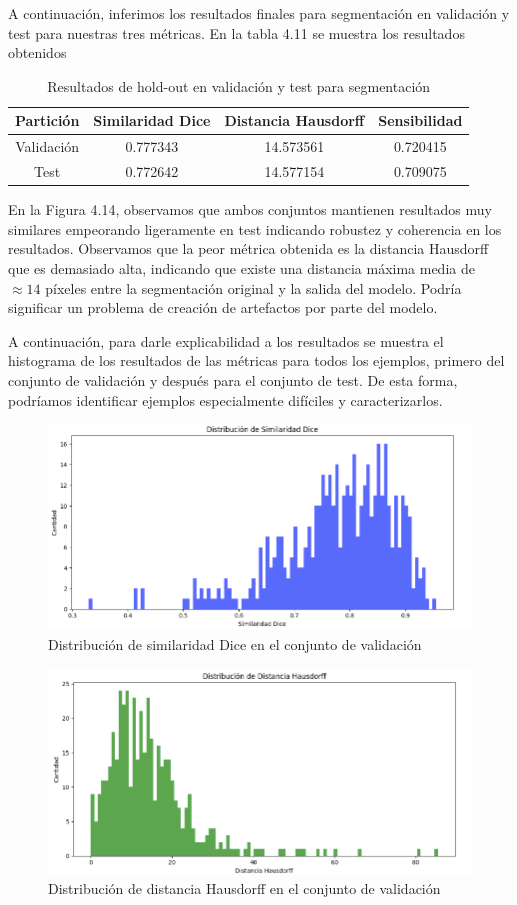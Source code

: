 A continuación, inferimos los resultados finales para segmentación en validación y test para nuestras tres métricas. En la tabla 4.11 se muestra los resultados obtenidos

\begin{table}[H]
	\centering
	\begin{tabular}{|cccc|}
		\toprule
		Partición & Similaridad Dice & Distancia Hausdorff & Sensibilidad \\ 
		\midrule
		Validación & 0.777343 & 14.573561 & 0.720415 \\ 
		Test & 0.772642 & 14.577154 & 0.709075 \\ 
		\bottomrule
	\end{tabular}
	\caption{Resultados de hold-out en validación y test para segmentación}
	\label{tabla:resultados5}
\end{table}

En la Figura 4.14, observamos que ambos conjuntos mantienen resultados muy similares empeorando ligeramente en test indicando robustez y coherencia en los resultados. Observamos que la peor métrica obtenida es la distancia Hausdorff que es demasiado alta, indicando que existe una distancia máxima media de $\approx 14$ píxeles entre la segmentación original y la salida del modelo. Podría significar un problema de creación de artefactos por parte del modelo.

A continuación, para darle explicabilidad a los resultados se muestra el histograma de los resultados de las métricas para todos los ejemplos, primero del conjunto de validación y después para el conjunto de test. De esta forma, podríamos identificar ejemplos especialmente difíciles y caracterizarlos.
\begin{figure}[H]
	\centering
	\includegraphics[width=0.7\linewidth]{imagenes/dist_dice_val.png}
	\caption{Distribución de similaridad Dice en el conjunto de validación}
\end{figure}

\begin{figure}[H]
	\centering
	\includegraphics[width=0.7\linewidth]{imagenes/dist_haus_val.png}
	\caption{Distribución de distancia Hausdorff en el conjunto de validación}
\end{figure}

